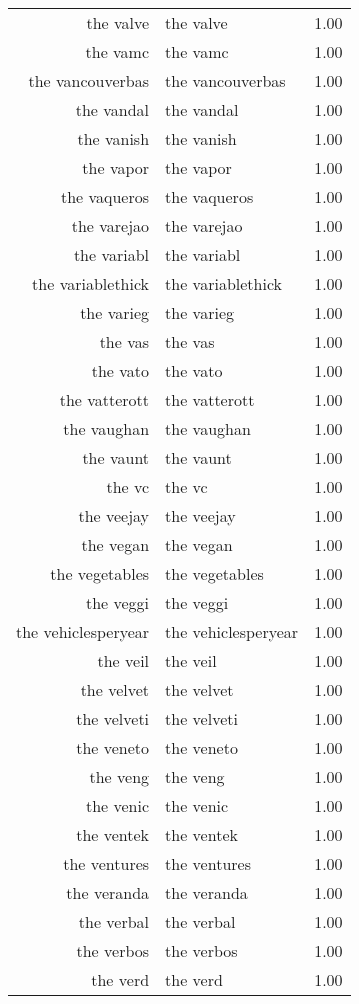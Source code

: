 \begin{table}[ht]
\begin{tabular}{rlr}
  the valve & the valve & 1.00 \\ 
  the vamc & the vamc & 1.00 \\ 
  the vancouverbas & the vancouverbas & 1.00 \\ 
  the vandal & the vandal & 1.00 \\ 
  the vanish & the vanish & 1.00 \\ 
  the vapor & the vapor & 1.00 \\ 
  the vaqueros & the vaqueros & 1.00 \\ 
  the varejao & the varejao & 1.00 \\ 
  the variabl & the variabl & 1.00 \\ 
  the variablethick & the variablethick & 1.00 \\ 
  the varieg & the varieg & 1.00 \\ 
  the vas & the vas & 1.00 \\ 
  the vato & the vato & 1.00 \\ 
  the vatterott & the vatterott & 1.00 \\ 
  the vaughan & the vaughan & 1.00 \\ 
  the vaunt & the vaunt & 1.00 \\ 
  the vc & the vc & 1.00 \\ 
  the veejay & the veejay & 1.00 \\ 
  the vegan & the vegan & 1.00 \\ 
  the vegetables & the vegetables & 1.00 \\ 
  the veggi & the veggi & 1.00 \\ 
  the vehiclesperyear & the vehiclesperyear & 1.00 \\ 
  the veil & the veil & 1.00 \\ 
  the velvet & the velvet & 1.00 \\ 
  the velveti & the velveti & 1.00 \\ 
  the veneto & the veneto & 1.00 \\ 
  the veng & the veng & 1.00 \\ 
  the venic & the venic & 1.00 \\ 
  the ventek & the ventek & 1.00 \\ 
  the ventures & the ventures & 1.00 \\ 
  the veranda & the veranda & 1.00 \\ 
  the verbal & the verbal & 1.00 \\ 
  the verbos & the verbos & 1.00 \\ 
  the verd & the verd & 1.00 \\ 

\end{tabular}
\end{table}
